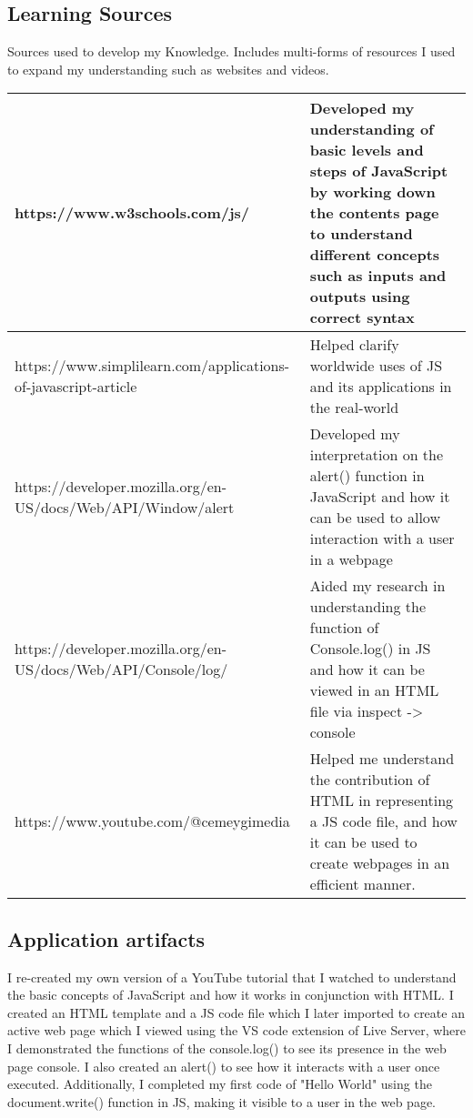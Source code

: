 \documentclass[a4paper, 11pt]{report}
\begin{document}
\subsection{Learning Sources}
Sources used to develop my Knowledge. Includes multi-forms of resources I used to expand my understanding such as websites and videos.

\begin{tabular}{|p{}|p{}|}
	\hline
	https://www.w3schools.com/js/ & Developed my understanding of basic levels and steps of JavaScript by working down the contents page to understand different concepts such as inputs and outputs using correct syntax  \\
	\hline
	https://www.simplilearn.com/applications-of-javascript-article & Helped clarify worldwide uses of JS and its applications in the real-world \\
	\hline
	https://developer.mozilla.org/en-US/docs/Web/API/Window/alert & Developed my interpretation on the alert() function in JavaScript and how it can be used to allow interaction with a user in a webpage\\
	\hline
	https://developer.mozilla.org/en-US/docs/Web/API/Console/log/ & Aided my research in understanding the function of Console.log() in JS and how it can be viewed in an HTML file via inspect -> console\\
	\hline
	https://www.youtube.com/@cemeygimedia & Helped me understand the contribution of HTML in representing a JS code file, and how it can be used to create webpages in an efficient manner.\\
	\hline
\end{tabular}

\subsection{Application artifacts}
I re-created my own version of a YouTube tutorial that I watched to understand the basic concepts of JavaScript and how it works in conjunction with HTML. I created an HTML template and a JS code file which I later imported to create an active web page which I viewed using the VS code extension of Live Server, where I demonstrated the functions of the console.log() to see its presence in the web page console. I also created an alert() to see how it interacts with a user once executed. Additionally, I completed my first code of "Hello World" using the document.write() function in JS, making it visible to a user in the web page.   
\end{document}

